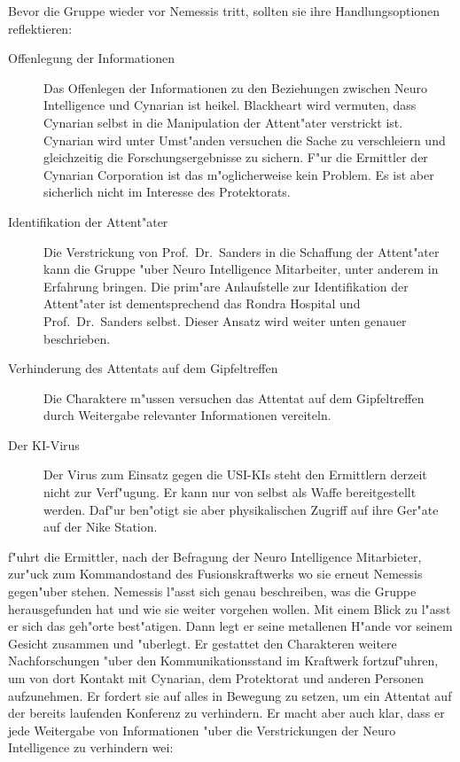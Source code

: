 
Bevor die Gruppe wieder vor Nemessis tritt, sollten sie ihre Handlungsoptionen reflektieren:

\begin{description}
	\item[Offenlegung der Informationen] Das Offenlegen der Informationen zu den Beziehungen zwischen Neuro Intelligence und Cynarian 	
		ist heikel. Blackheart wird vermuten, dass Cynarian selbst in die Manipulation der Attent"ater verstrickt ist. Cynarian wird unter Umst"anden versuchen die Sache zu verschleiern und gleichzeitig die Forschungsergebnisse zu 	sichern. F"ur die Ermittler der Cynarian Corporation ist das m"oglicherweise kein Problem. Es ist aber sicherlich nicht im Interesse des Protektorats.
	\item[Identifikation der Attent"ater] Die Verstrickung von Prof.~Dr.~Sanders in die Schaffung der Attent"ater kann die Gruppe "uber 	
		Neuro Intelligence Mitarbeiter, unter anderem \ml{} in Erfahrung bringen. Die prim"are Anlaufstelle zur Identifikation der Attent"ater ist dementsprechend das Rondra Hospital und Prof.~Dr.~Sanders selbst. Dieser Ansatz wird weiter unten genauer beschrieben.
	\item[Verhinderung des Attentats auf dem Gipfeltreffen] Die Charaktere m"ussen versuchen das Attentat auf dem Gipfeltreffen durch 
		Weitergabe relevanter Informationen vereiteln.
	\item[Der KI-Virus] Der Virus zum Einsatz gegen die USI-KIs steht den Ermittlern derzeit nicht zur Verf"ugung. Er kann nur von \ml{}
		selbst als Waffe bereitgestellt werden. Daf"ur ben"otigt sie aber physikalischen Zugriff auf ihre Ger"ate auf der Nike Station.
\end{description}

\xl{} f"uhrt die Ermittler, nach der Befragung der Neuro Intelligence Mitarbieter, zur"uck zum Kommandostand des Fusionskraftwerks wo sie erneut Nemessis gegen"uber stehen. Nemessis l"asst sich genau beschreiben, was die Gruppe herausgefunden hat und wie sie weiter vorgehen wollen. Mit einem Blick zu \xl{} l"asst er sich das geh"orte best"atigen. Dann legt er seine metallenen H"ande vor seinem Gesicht zusammen und "uberlegt. Er gestattet den Charakteren weitere Nachforschungen "uber den Kommunikationsstand im Kraftwerk fortzuf"uhren, um von dort Kontakt mit Cynarian, dem Protektorat und anderen Personen aufzunehmen. Er fordert sie auf alles in Bewegung zu setzen, um ein Attentat auf der bereits laufenden Konferenz zu verhindern. Er macht aber auch klar, dass er jede Weitergabe von Informationen "uber die Verstrickungen der Neuro Intelligence zu verhindern wei\3:

